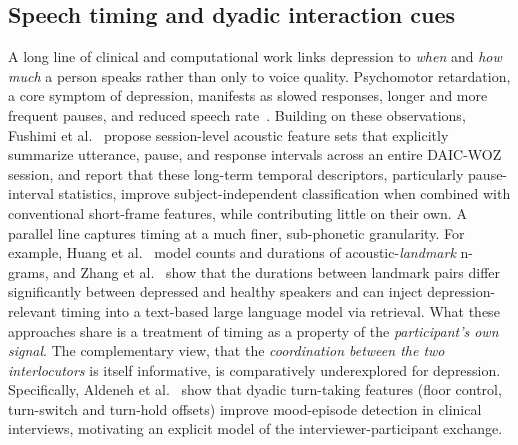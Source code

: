 \documentclass{article}
\begin{document}
\subsection{Speech timing and dyadic interaction cues}
A long line of clinical and computational work links depression to \emph{when} and \emph{how much} a person speaks rather than only to voice quality. 
Psychomotor retardation, a core symptom of depression, manifests as slowed responses, longer and more frequent pauses, and reduced speech rate~\cite{yamamoto2020timing,mundt2012vocal}. 
Building on these observations, Fushimi et al.~\cite{fushimi2026beyond} propose session-level acoustic feature sets that explicitly summarize utterance, pause, and response intervals across an entire DAIC-WOZ session, and report that these long-term temporal descriptors, particularly pause-interval statistics, improve subject-independent classification when combined with conventional short-frame features, while contributing little on their own. 
A parallel line captures timing at a much finer, sub-phonetic granularity. For example, Huang et al.~\cite{huang2020landmark} model counts and durations of acoustic-\emph{landmark} n-grams, and Zhang et al.~\cite{zhang2024llms,zhang2025speechtrag} show that the durations between landmark pairs differ significantly between depressed and healthy speakers and can inject depression-relevant timing into a text-based large language model via retrieval. 
What these approaches share is a treatment of timing as a property of the \emph{participant's own signal}. The complementary view, that the \emph{coordination between the two interlocutors} is itself informative, is comparatively underexplored for depression. 
Specifically, Aldeneh et al.~\cite{aldeneh2019mood} show that dyadic turn-taking features (floor control, turn-switch and turn-hold offsets) improve mood-episode detection in clinical interviews, motivating an explicit model of the interviewer-participant exchange.
\end{document}
